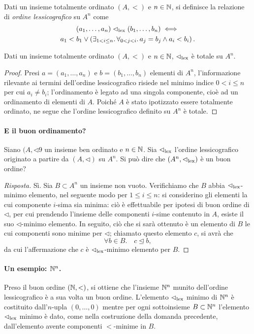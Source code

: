 \begin{dfn}
  Dati un insieme totalmente ordinato \((A,<)\) e \(n \in \mathbb{N}\), si definisce la relazione di \emph{ordine lessicografico} su \(A^n\) come
  \begin{multline}
    (a_1,\dots,a_n) \vartriangleleft_{\mathrm{lex}} (b_1,\dots,b_n) \iff \\ a_1 < b_1 \lor \left( \exists_{1 < i \le n}.\, \forall_{0 < j < i}.\, a_j = b_j \land a_i < b_i\right).
  \end{multline}
\end{dfn}
\begin{prp}
  Dati un insieme totalmente ordinato \((A, <)\) e \(n \in \mathbb{N}\), \(\vartriangleleft_{\mathrm{lex}}\) è totale su \(A^n\).
\end{prp}
\begin{proof}
  Presi \(a = (a_1,\dots,a_n)\) e \(b = (b_1,\dots,b_n)\) elementi di \(A^n\), l'informazione rilevante ai termini dell'ordine lessicografico risiede nel minimo indice \(0 < i \le n\) per cui \(a_i \neq b_i\); l'ordinamento è legato ad una singola componente, cioè ad un ordinamento di elementi di \(A\). Poiché \(A\) è stato ipotizzato essere totalmente ordinato, ne segue che l'ordine lessicografico definito su \(A^n\) è totale.
\end{proof}

\paragraph{E il buon ordinamento?} Siano \((A,\lhd9\) un insieme ben ordinato e \(n \in \mathbb{N}\). Sia \(\vartriangleleft_{\mathrm{lex}}\) l'ordine lessicografico originato a partire da \((A,\lhd)\) su \(A^n\). Si può dire che \((A^n,\vartriangleleft_{\mathrm{lex}})\) è un buon ordine?
\begin{proof}[Risposta]
  Sì. Sia \(B \subset A^n\) un insieme non vuoto. Verifichiamo che \(B\) abbia \(\vartriangleleft_{\mathrm{lex}}\)-minimo elemento, nel seguente modo per \(1 \le i \le n\): si considerino gli elementi la cui componente \(i\)-sima sia minima: ciò è effettuabile per ipotesi di buon ordine di \(\lhd\), per cui prendendo l'insieme delle componenti \(i\)-sime contenuto in \(A\), esiste il suo \(\lhd\)-minimo elemento. In seguito, ciò che si sarà ottenuto è un elemento di \(B\) le cui componenti sono minime per \(\lhd\); chiamato questo elemento \(c\), si avrà che
  \[
  \forall b \in B.\quad c \unlhd b,
  \]
  da cui l'affermazione che \(c\) è \(\vartriangleleft_{\mathrm{lex}}\)-minimo elemento per \(B\).
\end{proof}
\paragraph{Un esempio: \(\mathbb{N}^n\).} Preso il buon ordine \((\mathbb{N}, <)\), si ottiene che l'insieme \(\mathbb{N}^n\) munito dell'ordine lessicografico è a sua volta un buon ordine. L'elemento \(\vartriangleleft_{\mathrm{lex}}\) minimo di \(\mathbb{N}^n\) è costituito dall'\(n\)-upla \((0,\dots,0)\) mentre per ogni sottoinsieme \(B \subset \mathbb{N}^n\) l'elemento \(\vartriangleleft_{\mathrm{lex}}\) minimo è dato, come nella costruzione della domanda precedente, dall'elemento avente componenti \(<\)-minime in \(B\).

